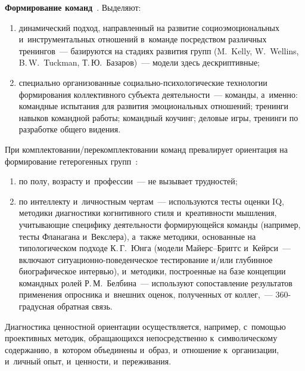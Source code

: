 \begin{multicols}{2}
  \textbf{Формирование команд}~\cite{10-r}. Выделяют:
  \begin{enumerate}[(1)]
  \item динамический 
подход, на\-прав\-лен\-ный на развитие социоэмоциональных и~инструментальных 
отношений в~команде по\-сред\-ст\-вом различных тренингов~--- базируются на 
стадиях развития групп (M.~Kelly, W.~Wellins, B.\,W.~Tuckman, 
Т.\,Ю.~Базаров)~--- модели здесь дескриптивные; 
\item специально 
организованные со\-ци\-аль\-но-пси\-хо\-ло\-ги\-че\-ские технологии 
формирования коллективного субъекта дея\-тель\-ности~--- команды, а~именно: 
командные испытания для развития эмоциональных отношений; тренинги 
навыков командной работы; командный коучинг; деловые игры, тренинги по 
разработке общего видения. 
\end{enumerate}
  
  При комплектовании/пе\-ре\-комп\-лек\-то\-ва\-нии команд превалирует 
ориентация на формирование гетерогенных групп~\cite{30-r}: 
\begin{enumerate}[(1)]
\item по полу, 
возрасту и~профессии~--- не вызывает трудностей; 
\item по интеллекту 
и~личностным чертам~--- используются тес\-ты оценки IQ, методики 
диагностики когнитивного стиля и~креативности мышления, учитывающие 
специфику дея\-тель\-ности фор\-ми\-ру\-ющей\-ся команды (например, тесты 
Фланагана и~Векслера), а~так\-же методики, основанные на типологическом 
подходе К.\,Г.~Юнга (модели Май\-ерс--Бриггс и~Кейрси~--- включают 
си\-ту\-а\-ци\-он\-но-по\-ве\-ден\-че\-ское тес\-ти\-ро\-ва\-ние и/или глубинное био\-гра\-фи\-че\-ское 
ин\-тервью), и~методики, по\-стро\-ен\-ные на базе концепции командных ролей 
Р.\,М.~Белбина~--- используют со\-по\-став\-ле\-ние результатов применения 
опросника и~внеш\-них оценок, полученных от коллег,~--- 360-гра\-дус\-ная 
об\-рат\-ная связь.
\end{enumerate}
 Диагностика ценностной ориентации осуществляется, 
например, с~по\-мощью проективных методик, об\-ра\-ща\-ющих\-ся непосредственно 
к~символическому содержанию, в~котором объединены и~образ, и~отношение 
к~организации, и~личный опыт, и~ценности, и~переживания. 
  

\end{multicols}
